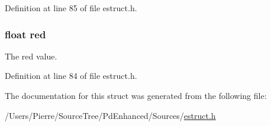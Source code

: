 Definition at line 85 of file estruct.\-h.

\hypertarget{struct__rgb_acddf4f34ba92c602d4205ba50e98d603}{
\subsubsection[{red}]{\setlength{\rightskip}{0pt plus 5cm}float red}}\label{struct__rgb_acddf4f34ba92c602d4205ba50e98d603}
The red value. 

Definition at line 84 of file estruct.\-h.



The documentation for this struct was generated from the following file\-:\begin{DoxyCompactItemize}
\item 
/\-Users/\-Pierre/\-Source\-Tree/\-Pd\-Enhanced/\-Sources/\hyperlink{estruct_8h}{estruct.\-h}\end{DoxyCompactItemize}
